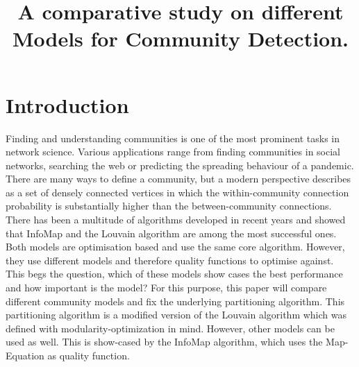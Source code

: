 \documentclass[11pt, twocolumn]{article}
\begin{document}
\title{A comparative study on different Models for Community Detection.}

\maketitle

\section{Introduction}
Finding and understanding communities is one of the most prominent tasks in network science. Various applications range from finding communities in social networks, searching the web or predicting the spreading behaviour of a pandemic. There are many ways to define a community, but a modern perspective describes as a set of densely connected vertices in which the within-community connection probability is substantially higher than the between-community connections.\cite{fortunato_CommunityDetectionNetworks_2016} There has been a multitude of algorithms developed in recent years and \citeauthor{lancichinetti_CommunityDetectionAlgorithms_2009} showed that InfoMap and the Louvain algorithm are among the most successful ones.\cite{lancichinetti_CommunityDetectionAlgorithms_2009} Both models are optimisation based and use the same core algorithm. However, they use different models and therefore quality functions to optimise against. This begs the question, which of these models show cases the best performance and how important is the model? For this purpose, this paper will compare different community models and fix the underlying partitioning algorithm. This partitioning algorithm is a modified version of the Louvain algorithm which was defined with modularity-optimization in mind.\cite{blondel_FastUnfoldingCommunities_2008} However, other models can be used as well. This is show-cased by the InfoMap algorithm, which uses the Map-Equation as quality function.\cite{rosvall_MapEquation_2009} 
\end{document}
